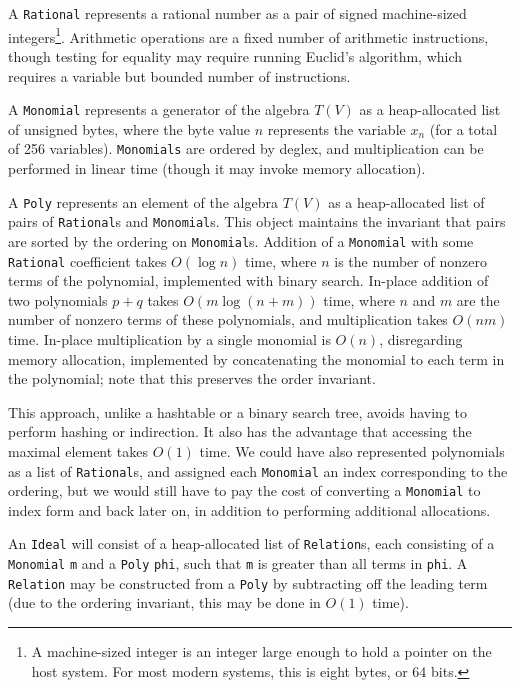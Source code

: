 \begin{defn}
    A \verb|Rational| represents a rational number as a pair of signed machine-sized 
    integers\footnote{A machine-sized integer is an integer large enough to hold a pointer on
    the host system. For most modern systems, this is eight bytes, or 64 bits.}. Arithmetic
    operations are a fixed number of arithmetic instructions, though testing for equality
    may require running Euclid's algorithm, which requires a variable but bounded number 
    of instructions.
    
    A \verb|Monomial| represents a generator of the algebra $T(V)$ as a heap-allocated
    list of unsigned bytes, where the byte value $n$ represents the variable $x_n$ 
    (for a total of 256 variables). \verb|Monomials| are ordered by deglex,
    and multiplication can be performed in linear time (though it may invoke memory
    allocation).

    A \verb|Poly| represents an element of the algebra $T(V)$ as a heap-allocated
    list of pairs of \verb|Rational|s and \verb|Monomial|s. This object maintains the
    invariant that pairs are sorted by the ordering on \verb|Monomial|s. Addition
    of a \verb|Monomial| with some \verb|Rational| coefficient takes $O(\log n)$ time,
    where $n$ is the number of nonzero terms of the polynomial, implemented with binary
    search. In-place addition of two polynomials $p + q$ takes $O(m\log (n+m))$ time, 
    where $n$ and $m$ are the number of nonzero terms of these polynomials, and
    multiplication takes $O(nm)$ time. In-place multiplication by a single monomial
    is $O(n)$, disregarding memory allocation, implemented by concatenating the monomial
    to each term in the polynomial; note that this preserves the order invariant.
    
    This approach, unlike a hashtable or a binary
    search tree, avoids having to perform hashing or indirection. It also has the
    advantage that accessing the maximal element takes $O(1)$ time. We could have
    also represented polynomials as a list of \verb|Rational|s, and assigned each
    \verb|Monomial| an index corresponding to the ordering, but we would still have to pay
    the cost of converting a \verb|Monomial| to index form and back later on, in addition
    to performing additional allocations.
    
    An \verb|Ideal| will consist of a heap-allocated list of \verb|Relation|s,
    each consisting of a \verb|Monomial| \verb|m| and a \verb|Poly| \verb|phi|, 
    such that \verb|m| is greater than all terms in \verb|phi|. A \verb|Relation|
    may be constructed from a \verb|Poly| by subtracting off the leading term (due
    to the ordering invariant, this may be done in $O(1)$ time).
\end{defn}

